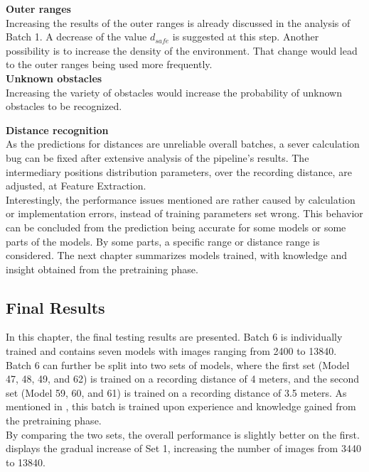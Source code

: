 \textbf{Outer ranges}\\
Increasing the results of the outer ranges is already discussed in the analysis of Batch 1. A decrease of the value $d_{safe}$ is suggested at this step. Another possibility is to increase the density of the environment. That change would lead to the outer ranges being used more frequently.\\

\textbf{Unknown obstacles}\\
Increasing the variety of obstacles would increase the probability of unknown obstacles to be recognized. 

\textbf{Distance recognition}\\
As the predictions for distances are unreliable overall batches, a sever calculation bug can be fixed after extensive analysis of the pipeline's results. The intermediary positions distribution parameters, over the recording distance, are adjusted, at Feature Extraction.\\

Interestingly, the performance issues mentioned are rather caused by calculation or implementation errors, instead of training parameters set wrong. This behavior can be concluded from the prediction being accurate for some models or some parts of the models. By some parts, a specific range or distance range is considered. The next chapter summarizes models trained, with knowledge and insight obtained from the pretraining phase.
\newpage

\subsection{Final Results \label{final_results}}
In this chapter, the final testing results are presented. Batch 6 is individually trained and contains seven models with images ranging from 2400 to 13840. Batch 6 can further be split into two sets of models, where the first set (Model 47, 48, 49, and 62) is trained on a recording distance of 4 meters, and the second set (Model 59, 60, and 61) is trained on a recording distance of 3.5 meters. As mentioned in , this batch is trained upon experience and knowledge gained from the pretraining phase.\\

By comparing the two sets, the overall performance is slightly better on the first.  displays the gradual increase of Set 1, increasing the number of images from 3440 to 13840.

